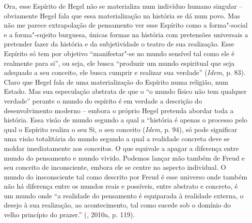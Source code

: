 Ora, esse Espírito de Hegel não se materializa num indivíduo humano
singular -- obviamente Hegel fala que essa materialização na história se
dá num povo. Mas não me parece extrapolação de pensamento ver esse
Espírito como a forma"-social e a forma"-sujeito burguesa, únicas formas
na história com pretensões universais a pretender fazer da história e da
subjetividade o teatro de sua realização. Esse Espírito só tem por
objetivo ``manifestar"-se no mundo sensível tal como ele é realmente para
si'', ou seja, ele busca ``produzir um mundo espiritual que seja
adequado a seu conceito, ele busca cumprir e realizar sua verdade''
(\emph{Idem,} p. 83). Claro que Hegel fala de uma materialização do
Espírito numa religião, num Estado. Mas sua especulação abstrata de que
o ``o mundo físico não tem qualquer verdade'' perante o mundo do
espírito é em verdade a descrição do desenvolvimento moderno -- embora o
próprio Hegel pretenda abordar toda a história. Essa visão de mundo
segundo a qual a ``história é apenas o processo pelo qual o Espírito
realiza o seu Si, o seu conceito (\emph{Idem,} p. 94), só pode
significar uma visão totalitária do mundo segundo a qual a realidade
concreta deve se moldar imediatamente aos conceitos. O que equivale a
apagar a diferença entre mundo do pensamento e mundo vivido. Podemos
lançar mão também de Freud e seu conceito de inconsciente, embora ele se
centre no aspecto individual. O mundo do insconsciente tal como descrito
por Freud é esse universo onde também não há diferença entre os mundos
reais e possíveis, entre abstrato e concreto, é um mundo onde ``a
realidade do pensamento é equiparada à realidade externa, o desejo à sua
realização, ao acontecimento, tal como sucede sob o domínio do velho
princípio do prazer.'' (, 2010a, p. 119).

